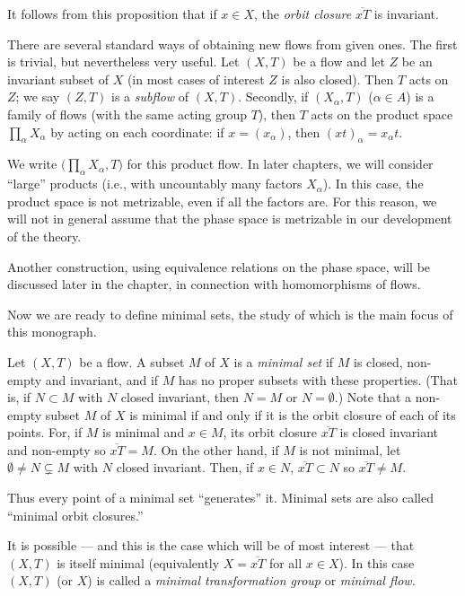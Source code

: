 It follows from this proposition that if $x \in X$, the \emph{orbit closure} $\overline{xT}$ is invariant.

There are several standard ways of obtaining new flows from given ones. The first is trivial, but nevertheless very useful. Let $(X,T)$ be a flow and let $Z$ be an invariant subset of $X$ (in most cases of interest $Z$ is also closed). Then $T$ acts on $Z$; we say $(Z,T)$ is a \emph{subflow} of $(X,T)$. Secondly, if $(X_\alpha, T)$ ($\alpha \in A$) is a family of flows (with the same acting group $T$), then $T$ acts on the product space $\prod_\alpha X_\alpha$ by acting on each coordinate: if $x = (x_\alpha)$, then $(xt)_\alpha = x_\alpha t$.

We write $\bigl(\prod_\alpha X_\alpha, T\bigr)$ for this product flow. In later chapters, we will consider ``large'' products (i.e., with uncountably many factors $X_\alpha$). In this case, the product space is not metrizable, even if all the factors are. For this reason, we will not in general assume that the phase space is metrizable in our development of the theory.

Another construction, using equivalence relations on the phase space, will be discussed later in the chapter, in connection with homomorphisms of flows.

Now we are ready to define minimal sets, the study of which is the main focus of this monograph.

Let $(X,T)$ be a flow. A subset $M$ of $X$ is a \emph{minimal set} if $M$ is closed, non-empty and invariant, and if $M$ has no proper subsets with these properties. (That is, if $N \subset M$ with $N$ closed invariant, then $N = M$ or $N = \emptyset$.) Note that a non-empty subset $M$ of $X$ is minimal if and only if it is the orbit closure of each of its points. For, if $M$ is minimal and $x \in M$, its orbit closure $\overline{xT}$ is closed invariant and non-empty so $\overline{xT} = M$. On the other hand, if $M$ is not minimal, let $\emptyset \neq N \subsetneq M$ with $N$ closed invariant. Then, if $x \in N$, $\overline{xT} \subset N$ so $\overline{xT} \ne M$.

Thus every point of a minimal set “generates” it. Minimal sets are also called “minimal orbit closures.”

It is possible — and this is the case which will be of most interest — that $(X,T)$ is itself minimal (equivalently $X = \overline{xT}$ for all $x \in X$). In this case $(X,T)$ (or $X$) is called a \emph{minimal transformation group} or \emph{minimal flow.}


